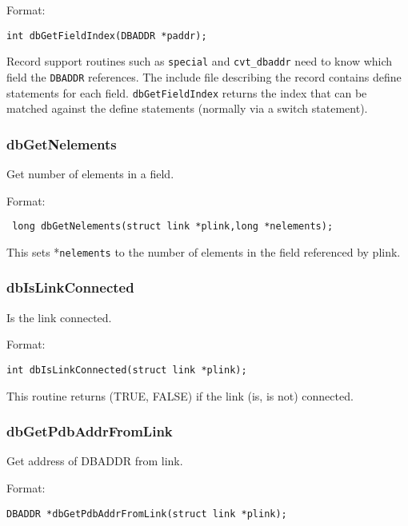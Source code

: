 Format:

\begin{verbatim}
int dbGetFieldIndex(DBADDR *paddr);
\end{verbatim}

Record support routines such as \verb|special| and \verb|cvt_dbaddr| need to know which field the \verb|DBADDR| references.
The include file describing the record contains define statements for each field.
\verb|dbGetFieldIndex| returns the index that can be matched against the define statements (normally via a switch statement).

\subsubsection{dbGetNelements}

Get number of elements in a field.

Format:

\begin{verbatim}
 long dbGetNelements(struct link *plink,long *nelements);
\end{verbatim}

This sets *\verb|nelements| to the number of elements in the field referenced by plink.

\subsubsection{dbIsLinkConnected}

Is the link connected.

Format:

\begin{verbatim}
int dbIsLinkConnected(struct link *plink);
\end{verbatim}

This routine returns (TRUE, FALSE) if the link (is, is not) connected.

\subsubsection{dbGetPdbAddrFromLink}

Get address of DBADDR from link.

Format:

\begin{verbatim}
DBADDR *dbGetPdbAddrFromLink(struct link *plink);
\end{verbatim}

